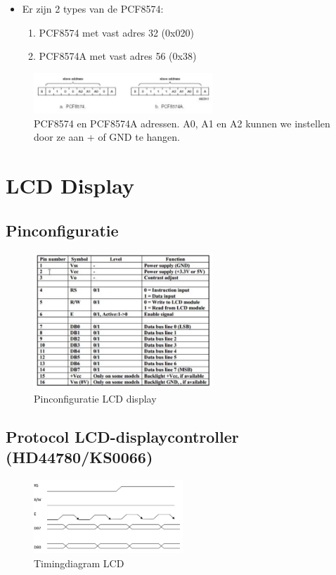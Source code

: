 \documentclass{article}
\begin{document}
\begin{itemize}
    \item Er zijn 2 types van de PCF8574:
    \begin{enumerate}
        \item PCF8574 met vast adres 32 (0x020)
        \item PCF8574A met vast adres 56 (0x38)
    \end{enumerate}
\end{itemize}

\begin{figure}[H]
    \centering
    \includegraphics[width=0.6\textwidth]{pcf-adres.png}
    \caption{PCF8574 en PCF8574A adressen. A0, A1 en A2 kunnen we instellen door ze aan + of GND te hangen.}
\end{figure}

\section{LCD Display}

\subsection{Pinconfiguratie}
\begin{figure}[H]
    \centering
    \includegraphics[width=0.6\textwidth]{lcd-pin.png}
    \caption{Pinconfiguratie LCD display}
\end{figure}

\subsection{Protocol LCD-displaycontroller (HD44780/KS0066)}
\begin{figure}[H]
    \centering
    \includegraphics[width=0.5\textwidth]{lcd-timing.png}
    \caption{Timingdiagram LCD}
\end{figure}
\end{document}
